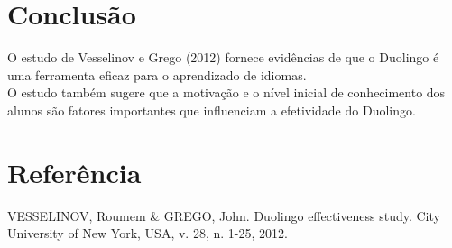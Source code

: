 \documentclass[a4paper, 12pt]{article}
\begin{document}
\section{Conclusão}
O estudo de Vesselinov e Grego (2012) fornece evidências de que o Duolingo é uma ferramenta eficaz para o aprendizado de idiomas. \\
O estudo também sugere que a motivação e o nível inicial de conhecimento dos alunos são fatores importantes que influenciam a efetividade do Duolingo.

\section{Referência}
VESSELINOV, Roumem & GREGO, John. Duolingo effectiveness study. City University of New York, USA, v. 28, n. 1-25, 2012.
\end{document}
